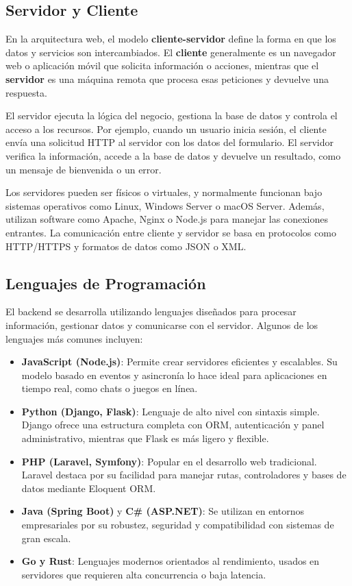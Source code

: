\documentclass[11pt]{scrartcl}
\begin{document}
\subsection{Servidor y Cliente}
En la arquitectura web, el modelo \textbf{cliente-servidor} define la forma en que los datos y servicios son intercambiados.  
El \textbf{cliente} generalmente es un navegador web o aplicación móvil que solicita información o acciones, mientras que el \textbf{servidor} es una máquina remota que procesa esas peticiones y devuelve una respuesta.

El servidor ejecuta la lógica del negocio, gestiona la base de datos y controla el acceso a los recursos. Por ejemplo, cuando un usuario inicia sesión, el cliente envía una solicitud HTTP al servidor con los datos del formulario. El servidor verifica la información, accede a la base de datos y devuelve un resultado, como un mensaje de bienvenida o un error.

Los servidores pueden ser físicos o virtuales, y normalmente funcionan bajo sistemas operativos como Linux, Windows Server o macOS Server. Además, utilizan software como Apache, Nginx o Node.js para manejar las conexiones entrantes. La comunicación entre cliente y servidor se basa en protocolos como HTTP/HTTPS y formatos de datos como JSON o XML.

\subsection{Lenguajes de Programación}
El backend se desarrolla utilizando lenguajes diseñados para procesar información, gestionar datos y comunicarse con el servidor.  
Algunos de los lenguajes más comunes incluyen:

\begin{itemize}
    \item \textbf{JavaScript (Node.js)}: Permite crear servidores eficientes y escalables. Su modelo basado en eventos y asincronía lo hace ideal para aplicaciones en tiempo real, como chats o juegos en línea.
    \item \textbf{Python (Django, Flask)}: Lenguaje de alto nivel con sintaxis simple. Django ofrece una estructura completa con ORM, autenticación y panel administrativo, mientras que Flask es más ligero y flexible.
    \item \textbf{PHP (Laravel, Symfony)}: Popular en el desarrollo web tradicional. Laravel destaca por su facilidad para manejar rutas, controladores y bases de datos mediante Eloquent ORM.
    \item \textbf{Java (Spring Boot)} y \textbf{C\# (ASP.NET)}: Se utilizan en entornos empresariales por su robustez, seguridad y compatibilidad con sistemas de gran escala.
    \item \textbf{Go y Rust}: Lenguajes modernos orientados al rendimiento, usados en servidores que requieren alta concurrencia o baja latencia.
\end{itemize}
\end{document}
